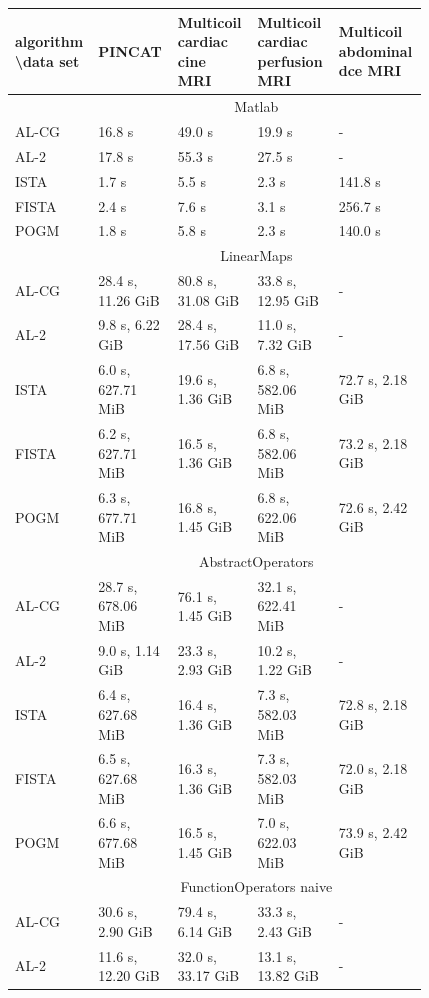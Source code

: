 \begin{table}[]
\footnotesize
\begin{tabular}{|p{0.1\linewidth}|p{0.18\linewidth}p{0.18\linewidth}p{0.18\linewidth}p{0.18\linewidth}|}
\hline
algorithm \textbackslash data set & PINCAT & Multicoil cardiac cine MRI & Multicoil cardiac perfusion MRI & Multicoil abdominal dce MRI \\ \hline
\multicolumn{1}{|c|}{} & \multicolumn{4}{c|}{Matlab} \\
AL-CG & 16.8 s & 49.0 s & 19.9 s & - \\
AL-2 & 17.8 s & 55.3 s & 27.5 s & - \\
ISTA & 1.7 s & 5.5 s & 2.3 s & 141.8 s \\
FISTA & 2.4 s & 7.6 s & 3.1 s & 256.7 s \\
POGM & 1.8 s & 5.8 s & 2.3 s & 140.0 s \\ \hline
\multicolumn{1}{|c|}{} & \multicolumn{4}{c|}{LinearMaps} \\
AL-CG & 28.4 s, 11.26 GiB & 80.8 s, 31.08 GiB & 33.8 s, 12.95 GiB & - \\
AL-2 & 9.8 s, 6.22 GiB & 28.4 s, 17.56 GiB & 11.0 s, 7.32 GiB & - \\
ISTA & 6.0 s, 627.71 MiB & 19.6 s, 1.36 GiB & 6.8 s, 582.06 MiB & 72.7 s, 2.18 GiB \\
FISTA & 6.2 s, 627.71 MiB & 16.5 s, 1.36 GiB & 6.8 s, 582.06 MiB & 73.2 s, 2.18 GiB \\
POGM & 6.3 s, 677.71 MiB & 16.8 s, 1.45 GiB & 6.8 s, 622.06 MiB & 72.6 s, 2.42 GiB \\ \hline
\multicolumn{1}{|c|}{} & \multicolumn{4}{c|}{AbstractOperators} \\
AL-CG & 28.7 s, 678.06 MiB & 76.1 s, 1.45 GiB & 32.1 s, 622.41 MiB & - \\
AL-2 & 9.0 s, 1.14 GiB & 23.3 s, 2.93 GiB & 10.2 s, 1.22 GiB & - \\
ISTA & 6.4 s, 627.68 MiB & 16.4 s, 1.36 GiB & 7.3 s, 582.03 MiB & 72.8 s, 2.18 GiB \\
FISTA & 6.5 s, 627.68 MiB & 16.3 s, 1.36 GiB & 7.3 s, 582.03 MiB & 72.0 s, 2.18 GiB \\
POGM & 6.6 s, 677.68 MiB & 16.5 s, 1.45 GiB & 7.0 s, 622.03 MiB & 73.9 s, 2.42 GiB \\ \hline
\multicolumn{1}{|c|}{} & \multicolumn{4}{c|}{FunctionOperators naive} \\
AL-CG & 30.6 s, 2.90 GiB & 79.4 s, 6.14 GiB & 33.3 s, 2.43 GiB & - \\
AL-2 & 11.6 s, 12.20 GiB & 32.0 s, 33.17 GiB & 13.1 s, 13.82 GiB & - \\

\end{tabular}
\end{table}
